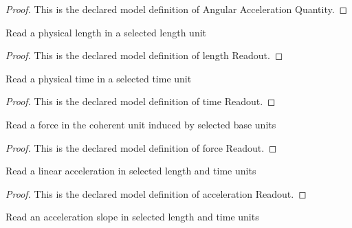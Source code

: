 \begin{proof}
  This is the declared model definition of Angular Acceleration Quantity.
\end{proof}
\begin{definition}
  \label{def:physics:phyx-mini-0772:phyxminiproblems-problemphyxmini0772-lengthreadout}
  Read a physical length in a selected length unit
\end{definition}
\begin{proof}
  This is the declared model definition of length Readout.
\end{proof}
\begin{definition}
  \label{def:physics:phyx-mini-0772:phyxminiproblems-problemphyxmini0772-timereadout}
  Read a physical time in a selected time unit
\end{definition}
\begin{proof}
  This is the declared model definition of time Readout.
\end{proof}
\begin{definition}
  \label{def:physics:phyx-mini-0772:phyxminiproblems-problemphyxmini0772-forcereadout}
  Read a force in the coherent unit induced by selected base units
\end{definition}
\begin{proof}
  This is the declared model definition of force Readout.
\end{proof}
\begin{definition}
  \label{def:physics:phyx-mini-0772:phyxminiproblems-problemphyxmini0772-accelerationreadout}
  Read a linear acceleration in selected length and time units
\end{definition}
\begin{proof}
  This is the declared model definition of acceleration Readout.
\end{proof}
\begin{definition}
  \label{def:physics:phyx-mini-0772:phyxminiproblems-problemphyxmini0772-accelerationslopereadout}
  Read an acceleration slope in selected length and time units
\end{definition}
